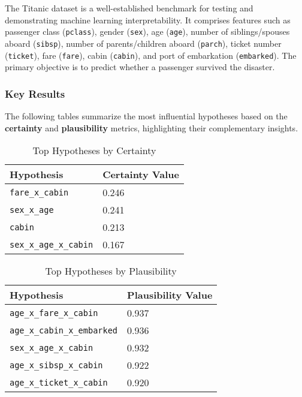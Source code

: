 \documentclass[acmlarge]{acmart}
\begin{document}
The Titanic dataset is a well-established benchmark for testing and demonstrating machine learning interpretability. It comprises features such as passenger class (\texttt{pclass}), gender (\texttt{sex}), age (\texttt{age}), number of siblings/spouses aboard (\texttt{sibsp}), number of parents/children aboard (\texttt{parch}), ticket number (\texttt{ticket}), fare (\texttt{fare}), cabin (\texttt{cabin}), and port of embarkation (\texttt{embarked}). The primary objective is to predict whether a passenger survived the disaster.


\subsubsection{Key Results}

The following tables summarize the most influential hypotheses based on the \textbf{certainty} and \textbf{plausibility} metrics, highlighting their complementary insights.

\begin{table}[H]
    \caption{Top Hypotheses by Certainty}
    \label{tab:top_certainty}
    \centering
    \begin{tabularx}{\textwidth}{|Y|Y|}
        \hline
        \textbf{Hypothesis} & \textbf{Certainty Value} \\
        \hline
        \texttt{fare\_x\_cabin} & 0.246 \\
        \texttt{sex\_x\_age} & 0.241 \\
        \texttt{cabin} & 0.213 \\
        \texttt{sex\_x\_age\_x\_cabin} & 0.167 \\
        \hline
    \end{tabularx}
\end{table}

\begin{table}[H]
    \caption{Top Hypotheses by Plausibility}
    \label{tab:top_plausibility}
    \centering
    \begin{tabularx}{\textwidth}{|Y|Y|}
        \hline
        \textbf{Hypothesis} & \textbf{Plausibility Value} \\
        \hline
        \texttt{age\_x\_fare\_x\_cabin} & 0.937 \\
        \texttt{age\_x\_cabin\_x\_embarked} & 0.936 \\
        \texttt{sex\_x\_age\_x\_cabin} & 0.932 \\
        \texttt{age\_x\_sibsp\_x\_cabin} & 0.922 \\
        \texttt{age\_x\_ticket\_x\_cabin} & 0.920 \\
        \hline
    \end{tabularx}
\end{table}
\end{document}
